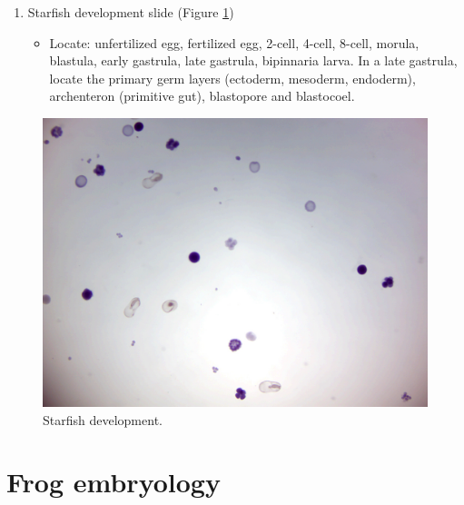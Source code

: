 \begin{enumerate}
\def\labelenumi{\arabic{enumi}.}
\tightlist
\item
  Starfish development slide (Figure \ref{fig:development})

  \begin{itemize}
  \tightlist
  \item
    Locate: unfertilized egg, fertilized egg, 2-cell, 4-cell, 8-cell,
    morula, blastula, early gastrula, late gastrula, bipinnaria larva.
    In a late gastrula, locate the primary germ layers (ectoderm,
    mesoderm, endoderm), archenteron (primitive gut), blastopore and
    blastocoel.
  \end{itemize}
\end{enumerate}

\begin{figure}

{\centering \includegraphics[width=0.7\linewidth]{./figures/development/starfish_development}

}

\caption{Starfish development.}\label{fig:development}
\end{figure}

\section{Frog embryology}\label{frog-embryology}

